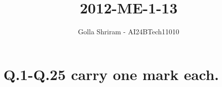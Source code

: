 \documentclass[journal,12pt,twocolumn]{IEEEtran}
\theoremstyle{remark}
\begin{document}
\onecolumn


\vspace{3cm}
\title{ 2012-ME-1-13 }
\author{Golla Shriram - AI24BTech11010}

\maketitle

\renewcommand{\thefigure}{\theenumi}
\renewcommand{\thetable}{\theenumi}

\section{ Q.1-Q.25 carry one mark each. }
                                                                           
\end{document}
